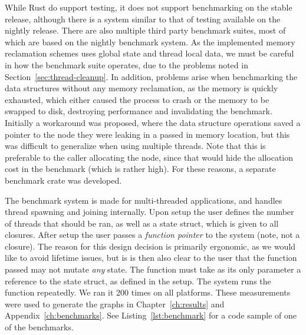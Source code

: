 \documentclass[b5paper]{report}
\begin{document}
While Rust do support testing, it does not support benchmarking on the stable
release, although there is a system similar to that of testing available on the
nightly release. There are also multiple third party benchmark suites, most of
which are based on the nightly benchmark system. As the implemented memory
reclamation schemes uses global state and thread local data, we must be careful
in how the benchmark suite operates, due to the problems noted in
Section~\ref{sec:thread-cleanup}. In addition, problems arise when benchmarking
the data structures without any memory reclamation, as the memory is quickly
exhausted, which either caused the process to crash or the memory to be swapped
to disk, destroying performance and invalidating the benchmark. Initially a
workaround was proposed, where the data structure operations saved a pointer to
the node they were leaking in a passed in memory location, but this was
difficult to generalize when using multiple threads. Note that this is
preferable to the caller allocating the node, since that would hide the
allocation cost in the benchmark (which is rather high). For these reasons, a
separate benchmark crate was developed.

The benchmark system is made for multi-threaded applications, and handles thread
spawning and joining internally. Upon setup the user defines the number of
threads that should be ran, as well as a state struct, which is given to all
closures. After setup the user passes a \emph{function pointer} to the system
(note, not a closure). The reason for this design decision is primarily
ergonomic, as we would like to avoid lifetime issues, but is is then also clear
to the user that the function passed may not mutate \emph{any} state. The
function must take as its only parameter a reference to the state struct, as
defined in the setup. The system runs the function repeatedly. We ran it 200
times on all platforms. These measurements were used to generate the graphs in
Chapter~\ref{ch:results} and Appendix~\ref{ch:benchmarks}. See
Listing~\ref{lst:benchmark} for a code sample of one of the benchmarks.
\end{document}

